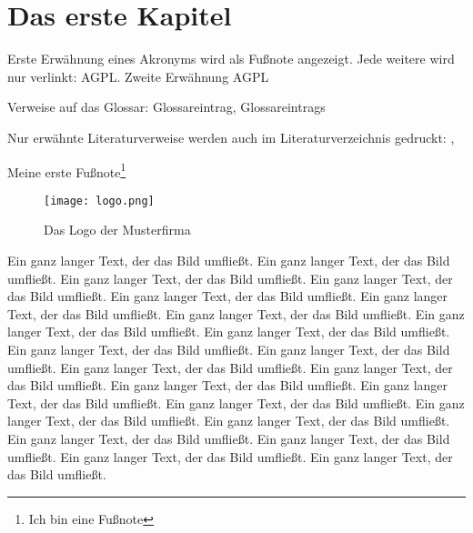 
\chapter{Das erste Kapitel}
Erste Erwähnung eines Akronyms wird als Fußnote angezeigt. Jede weitere wird
nur verlinkt: \ac{AGPL}. Zweite Erwähnung \ac{AGPL}

Verweise auf das Glossar: \gls{Glossareintrag}, \glspl{Glossareintrag}

Nur erwähnte Literaturverweise werden auch im Literaturverzeichnis gedruckt:
\cite{baumgartner:2002}, \cite{dreyfus:1980}

Meine erste Fußnote\footnote{Ich bin eine Fußnote}

\begin{wrapfigure}{r}{.4\textwidth}
\texttt{[image: logo.png]}
\vspace{-15pt}
\caption{Das Logo der Musterfirma\footnotemark}
\end{wrapfigure}
Ein ganz langer Text, der das Bild umfließt. Ein ganz langer Text, der das Bild
umfließt. Ein ganz langer Text, der das Bild umfließt. Ein ganz langer Text, der
das Bild umfließt. Ein ganz langer Text, der das Bild umfließt. Ein ganz langer
Text, der das Bild umfließt. Ein ganz langer Text, der das Bild umfließt. Ein
ganz langer Text, der das Bild umfließt. Ein ganz langer Text, der das Bild
umfließt. Ein ganz langer Text, der das Bild umfließt. Ein ganz langer Text, der
das Bild umfließt. Ein ganz langer Text, der das Bild umfließt. Ein ganz langer Text, der das Bild
umfließt. Ein ganz langer Text, der das Bild umfließt. Ein ganz langer Text, der
das Bild umfließt. Ein ganz langer Text, der das Bild umfließt. Ein ganz langer
Text, der das Bild umfließt. Ein ganz langer Text, der das Bild umfließt. Ein
ganz langer Text, der das Bild umfließt. Ein ganz langer Text, der das Bild
umfließt. Ein ganz langer Text, der das Bild umfließt. Ein ganz langer Text, der
das Bild umfließt.
